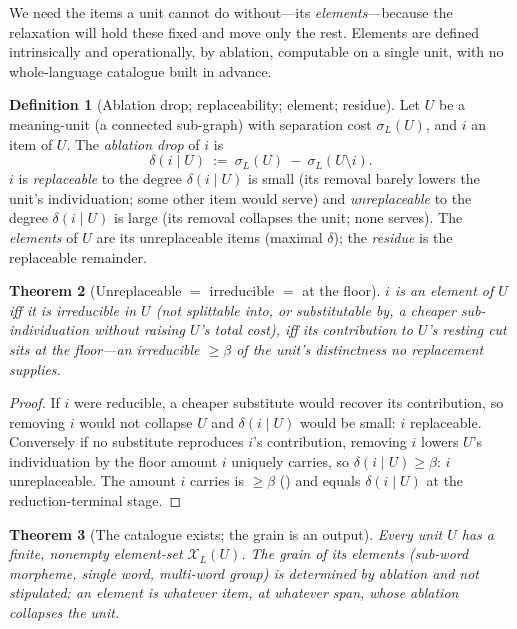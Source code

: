 \documentclass[11pt,a4paper]{article}
\theoremstyle{thmstyle}
\newtheorem{theorem}{Theorem}[section]
\theoremstyle{definition}
\newtheorem{definition}[theorem]{Definition}
\theoremstyle{remark}
\newcommand{\Lang}{L}
\newcommand{\flo}{\beta}               %
\newcommand{\str}{\sigma}              %
\newcommand{\Elt}{\mathcal{X}}         %
\newcommand{\abl}{\delta}              %
\begin{document}
We need the items a unit cannot do without---its \emph{elements}---because
the relaxation will hold these fixed and move only the rest. Elements are
defined intrinsically and operationally, by ablation, computable on a single
unit, with no whole-language catalogue built in advance.

\begin{definition}[Ablation drop; replaceability; element; residue]
\label{def:ablation}
Let $U$ be a meaning-unit (a connected sub-graph) with separation cost
$\str_\Lang(U)$, and $i$ an item of $U$. The \emph{ablation drop} of $i$ is
\[
\abl(i\mid U)\ :=\ \str_\Lang(U)\ -\ \str_\Lang(U\setminus i).
\]
$i$ is \emph{replaceable} to the degree $\abl(i\mid U)$ is small (its removal
barely lowers the unit's individuation; some other item would serve) and
\emph{unreplaceable} to the degree $\abl(i\mid U)$ is large (its removal
collapses the unit; none serves). The \emph{elements} of $U$ are its
unreplaceable items (maximal $\abl$); the \emph{residue} is the replaceable
remainder.
\end{definition}

\begin{theorem}[Unreplaceable $=$ irreducible $=$ at the floor]
\label{thm:element-floor}
$i$ is an element of $U$ iff it is irreducible in $U$ (not splittable into,
or substitutable by, a cheaper sub-individuation without raising $U$'s total
cost), iff its contribution to $U$'s resting cut sits at the floor---an
irreducible $\ge\flo$ of the unit's distinctness no replacement supplies.
\end{theorem}

\begin{proof}
If $i$ were reducible, a cheaper substitute would recover its contribution,
so removing $i$ would not collapse $U$ and $\abl(i\mid U)$ would be small:
$i$ replaceable. Conversely if no substitute reproduces $i$'s contribution,
removing $i$ lowers $U$'s individuation by the floor amount $i$ uniquely
carries, so $\abl(i\mid U)\ge\flo$: $i$ unreplaceable. The amount $i$ carries
is $\ge\flo$ () and equals $\abl(i\mid U)$ at the
reduction-terminal stage.
\end{proof}

\begin{theorem}[The catalogue exists; the grain is an output]
\label{thm:catalogue}
Every unit $U$ has a finite, nonempty element-set $\Elt_\Lang(U)$. The
\emph{grain} of its elements (sub-word morpheme, single word, multi-word
group) is determined by ablation and not stipulated: an element is whatever
item, at whatever span, whose ablation collapses the unit.
\end{theorem}
\end{document}
